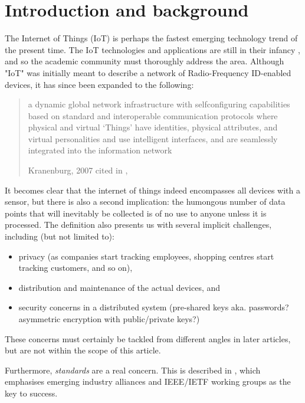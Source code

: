 \section{Introduction and background}
The Internet of Things (IoT) is perhaps the fastest emerging technology trend of the present time. The IoT technologies and applications are still in their infancy \autocite{xu-he-li:internet-of-things-in-industries-a-survery:2014}, and so the academic community must thoroughly address the area. Although "IoT" was initially meant to describe a network of Radio-Frequency ID-enabled devices, it has since been expanded to the following:

\blockquote[{Kranenburg, 2007 cited in \citeauthor{xu-he-li:internet-of-things-in-industries-a-survery:2014}, \citeyear[1]{xu-he-li:internet-of-things-in-industries-a-survery:2014}}]{a dynamic global network infrastructure with selfconfiguring capabilities based on standard and interoperable communication protocols where physical and virtual ‘Things’ have identities, physical attributes, and virtual personalities and use intelligent interfaces, and are seamlessly integrated into the information network}.

It becomes clear that the internet of things indeed encompasses all devices with a sensor, but there is also a second implication: the humongous number of data points that will inevitably be collected is of no use to anyone unless it is processed. The definition also presents us with several implicit challenges, including (but not limited to):

\begin{itemize}
  \item privacy (as companies start tracking employees, shopping centres start tracking customers, and so on),
  \item distribution and maintenance of the actual devices, and
  \item security concerns in a distributed system (pre-shared keys aka. passwords? asymmetric encryption with public/private keys?)
\end{itemize}

These concerns must certainly be tackled from different angles in later articles, but are not within the scope of this article.

Furthermore, \textit{standards} are a real concern. This is described in \textcite{palattella-accettura-vilajosana-watteyne-gieco-boggia-dohler:standardized-protocol-stack-for-the-internet-of-important-things:2012}, which emphasises emerging industry alliances and IEEE/IETF working groups as the key to success.

